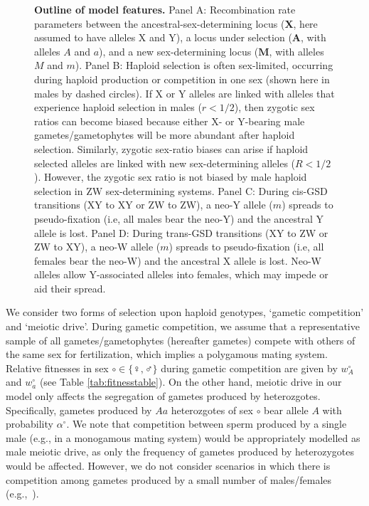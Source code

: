 \documentclass[10pt,letterpaper]{article}
\providecommand{\DIFdelbeginFL}{} %
\providecommand{\DIFdelendFL}{} %
\begin{document}
\begin{figure}[!h]
\DIFdelbeginFL %
\DIFdelendFL %
\caption{
{\bf Outline of model features.}
Panel A: Recombination rate parameters between the ancestral-sex-determining locus ($\mathbf{X}$, here assumed to have alleles X and Y), a locus under selection ($\mathbf{A}$, with alleles $A$ and $a$), and a new sex-determining locus ($\mathbf{M}$, with alleles $M$ and $m$). 
Panel B: Haploid selection is often sex-limited, occurring during haploid production or competition in one sex (shown here in males by dashed circles). 
If X or Y alleles are linked with alleles that experience haploid selection in males ($r<1/2$), then zygotic sex ratios can become biased because either X- or Y-bearing male gametes/gametophytes will be more abundant after haploid selection. 
Similarly, zygotic sex-ratio biases can arise if haploid selected alleles are linked with new sex-determining alleles ($R<1/2$). 
However, the zygotic sex ratio is not biased by male haploid selection in ZW sex-determining systems. 
Panel C: During cis-GSD transitions (XY to XY or ZW to ZW), a neo-Y allele ($m$) spreads to pseudo-fixation (i.e, all males bear the neo-Y) and the ancestral Y allele is lost. 
Panel D: During trans-GSD transitions (XY to ZW or ZW to XY), a neo-W allele ($m$) spreads to pseudo-fixation (i.e, all females bear the neo-W) and the ancestral X allele is lost. 
Neo-W alleles allow Y-associated alleles into females, which may impede or aid their spread. 
}
\label{fig:model_outline}
\end{figure}

We consider two forms of selection upon haploid genotypes, `gametic competition' and `meiotic drive'. 
During gametic competition, we assume that a representative sample of all gametes/gametophytes (hereafter gametes) compete with others of the same sex for fertilization, which implies a polygamous mating system. 
Relative fitnesses in sex $\circ \in \{\female,\male\}$ during gametic competition are given by $w_A^\circ$ and $w_a^\circ$ (see Table \ref{tab:fitnesstable}).
On the other hand, meiotic drive in our model only affects the segregation of gametes produced by heterozgotes.
Specifically, gametes produced by $Aa$ heterozgotes of sex $\circ$ bear allele $A$ with probability $\alpha^\circ$. 
We note that competition between sperm produced by a single male (e.g., in a monogamous mating system) would be appropriately modelled as male meiotic drive, as only the frequency of gametes produced by heterozygotes would be affected. 
However, we do not consider scenarios in which there is competition among gametes produced by a small number of males/females (e.g.,~\cite{Holman:2015en}).
\end{document}

